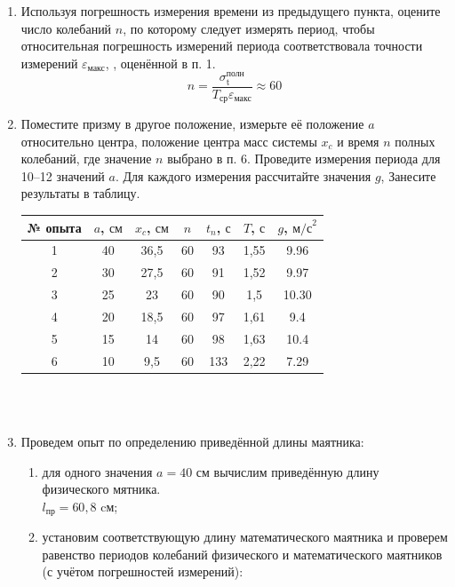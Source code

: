 \documentclass[a4paper, 12pt]{article}
\begin{document}
\begin{enumerate}
\begin{enumerate}
\begin{minipage}{\linewidth}
\end{minipage}\\\\\\\\\\\\\
\end{enumerate}
\item Используя погрешность измерения времени из предыдущего пункта,
оцените число колебаний $n$, по которому следует измерять период,
чтобы относительная погрешность измерений периода соответствовала точности измерений $\varepsilon_{\text{макс}}$, , оценённой в п. 1.
\[ n = \dfrac{\sigma_{\text{t}}^{\text{полн}}}{T_{\text{ср}}\varepsilon_{\text{макс}}} \approx 60\]
\item Поместите призму в другое положение, измерьте её положение $a$ относительно центра, положение центра масс системы $x_c$ и время $n$ полных
колебаний, где значение $n$ выбрано в п. 6. Проведите измерения периода для 10–12 значений $a$. Для каждого измерения рассчитайте значения $g$, Занесите результаты в таблицу.
\begin{tabular}{|c|c|c|c|c|c|c|}
\hline 
№ опыта & $a$,  $\text{см}$ & $x_c$, $\text{см}$ & $n$ & $t_n$, $\text{с}$ & $T$, $\text{с}$ & $g$, $\text{м/с}^2$ \\ 
\hline 
1 & 40 & 36,5 & 60 & 93 & 1,55 & 9.96 \\ 
\hline 
2 & 30 & 27,5 & 60 & 91 & 1,52 & 9.97 \\ 
\hline 
3 & 25 & 23 & 60 & 90 & 1,5 & 10.30 \\ 
\hline 
4 & 20 & 18,5 & 60 & 97 & 1,61 & 9.4 \\ 
\hline 
5 & 15 & 14 & 60 & 98 & 1,63 & 10.4 \\ 
\hline 
6 & 10 & 9,5 & 60 & 133 & 2,22 & 7.29 \\ 
\hline
\end{tabular} \\\
\item Проведем опыт по определению приведённой длины маятника:
\begin{enumerate}
\item для одного значения $a = 40 \text{ см}$ вычислим приведённую длину физического мятника.\\ $l_{\text{пр}} = 60,8 \text{ cм}$;
\item установим соответствующую длину математического маятника и
проверем равенство периодов колебаний физического и математического маятников (с учётом погрешностей измерений):

\end{enumerate}
\end{enumerate}
\end{document}
